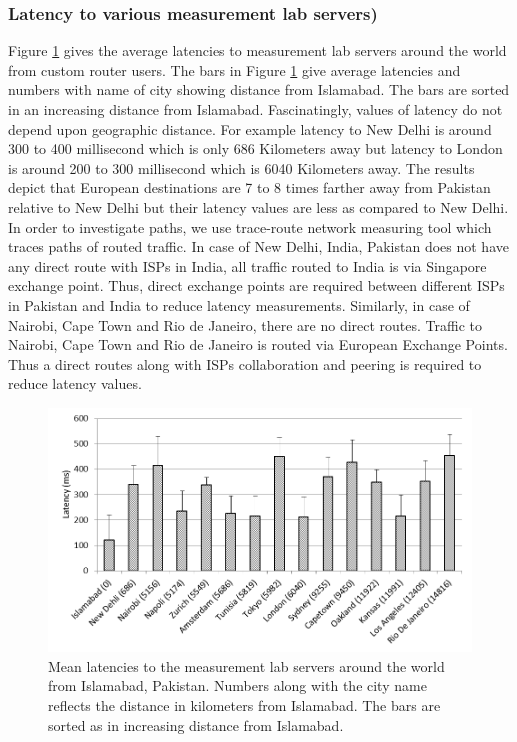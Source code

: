 \documentclass{sig-alternate-10pt}
\begin{document}
\begin{sloppypar}
\subsubsection {Latency to various measurement lab servers)}
Figure \ref{Fig:13} gives the average latencies to measurement lab servers around the world from custom router users. The bars in Figure \ref{Fig:13} give average latencies and numbers with name of city showing distance from Islamabad. The bars are sorted in an increasing distance from Islamabad. Fascinatingly, values of latency do not depend upon geographic distance. For example latency to New Delhi is around 300 to 400 millisecond which is only 686 Kilometers away but latency to London is around 200 to 300 millisecond which is 6040 Kilometers away. The results depict that European destinations are 7 to 8 times farther away from Pakistan relative to New Delhi but their latency values are less as compared to New Delhi. In order to investigate paths, we use trace-route network measuring tool which traces paths of routed traffic. In case of New Delhi, India, Pakistan does not have any direct route with ISPs in India, all traffic routed to India is via Singapore exchange point. Thus, direct exchange points are required between different ISPs in Pakistan and India to reduce latency measurements. Similarly, in case of Nairobi, Cape Town and Rio de Janeiro, there are no direct routes. Traffic to Nairobi, Cape Town and Rio de Janeiro is routed via European Exchange Points. Thus a direct routes along with ISPs collaboration and peering is required to reduce latency values.
 \begin{figure}[t!]
\begin {center}
   \includegraphics[height=0.2 \textheight,width=0.5 \textwidth]{12.png}
   \end {center}
 \caption{Mean latencies to the measurement lab servers around the world from Islamabad, Pakistan. Numbers along with the city name reflects the distance in kilometers from Islamabad. The bars are sorted as in increasing distance from Islamabad.}
 \label{Fig:13}
\end{figure}


\end{sloppypar}
\end{document}
